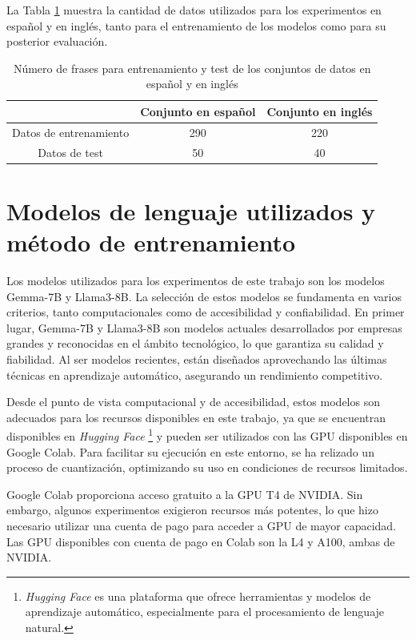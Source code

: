 \documentclass[11pt,spanish,listoffigures,listoftables]{tfgetsinf}
\begin{document}
La Tabla \ref{tab:frases} muestra la cantidad de datos utilizados para los experimentos en español y en inglés, tanto para el entrenamiento de los modelos como para su posterior evaluación.

\begin{table}[!h]
\caption{Número de frases para entrenamiento y test de los conjuntos de datos en español y en inglés}
\begin{center}
\begin{tabular}{  c || c  c  }
	\ & Conjunto en español & Conjunto en inglés \\
	\hline
	Datos de entrenamiento & 290 & 220 \\
	Datos de test & 50 & 40
\end{tabular}
\end{center}
\label{tab:frases}
\end{table}

\section{Modelos de lenguaje utilizados y método de entrenamiento}

Los modelos utilizados para los experimentos de este trabajo son los modelos Gemma-7B y Llama3-8B. La selección de estos modelos se fundamenta en varios criterios, tanto computacionales como de accesibilidad y confiabilidad. En primer lugar, Gemma-7B y Llama3-8B son modelos actuales desarrollados por empresas grandes y reconocidas en el ámbito tecnológico, lo que garantiza su calidad y fiabilidad. Al ser modelos recientes, están diseñados aprovechando las últimas técnicas en aprendizaje automático, asegurando un rendimiento competitivo.

Desde el punto de vista computacional y de accesibilidad, estos modelos son adecuados para los recursos disponibles en este trabajo, ya que se encuentran disponibles en \textit{Hugging Face} \footnote{\textit{Hugging Face} es una plataforma que ofrece herramientas y modelos de aprendizaje automático, especialmente para el procesamiento de lenguaje natural.} y pueden ser utilizados con las GPU disponibles en Google Colab. Para facilitar su ejecución en este entorno, se ha relizado un proceso de cuantización, optimizando su uso en condiciones de recursos limitados.

Google Colab proporciona acceso gratuito a la GPU T4 de NVIDIA. Sin embargo, algunos experimentos exigieron recursos más potentes, lo que hizo necesario utilizar una cuenta de pago para acceder a GPU de mayor capacidad. Las GPU disponibles con cuenta de pago en Colab son la L4 y A100, ambas de NVIDIA.
\end{document}
